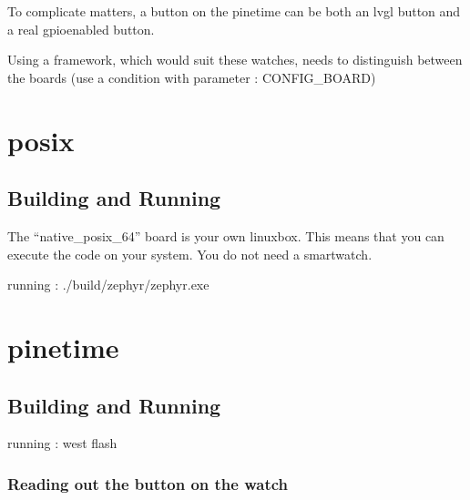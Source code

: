 \documentclass[letterpaper,10pt,english]{sphinxmanual}
\begin{document}
To complicate matters, a button on the pinetime can be both an lvgl button and a  real gpio\sphinxhyphen{}enabled button.

Using a framework, which would suit these watches, needs to distinguish between the boards (use a condition with parameter : CONFIG\_BOARD)


\section{posix}
\label{\detokenize{basicapplications:posix}}

\subsection{Building and Running}
\label{\detokenize{basicapplications:building-and-running}}
The “native\_posix\_64” board is your own linux\sphinxhyphen{}box.
This means that you can execute the code on your system.
You do not need a smartwatch.

\begin{sphinxVerbatim}[commandchars=\\\{\}]
\end{sphinxVerbatim}

running : ./build/zephyr/zephyr.exe


\section{pinetime}
\label{\detokenize{basicapplications:pinetime}}

\subsection{Building and Running}
\label{\detokenize{basicapplications:id1}}
\begin{sphinxVerbatim}[commandchars=\\\{\}]
\end{sphinxVerbatim}

running : west flash


\subsubsection{Reading out the button on the watch}
\label{\detokenize{basicapplications:reading-out-the-button-on-the-watch}}
\begin{sphinxVerbatim}[commandchars=\\\{\}]
        
       
      
\end{sphinxVerbatim}
\end{document}
